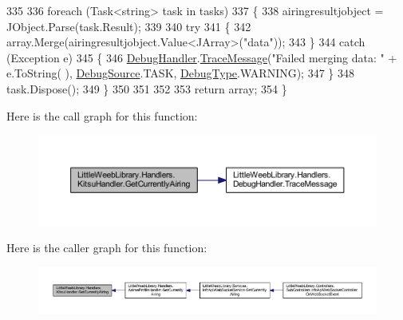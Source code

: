 \begin{DoxyCode}
335 
336             \textcolor{keywordflow}{foreach} (Task<string> task \textcolor{keywordflow}{in} tasks)
337             \{
338                 airingresultjobject = JObject.Parse(task.Result);
339 
340                 \textcolor{keywordflow}{try}
341                 \{
342                     array.Merge(airingresultjobject.Value<JArray>(\textcolor{stringliteral}{"data"}));
343                 \}
344                 \textcolor{keywordflow}{catch} (Exception e)
345                 \{
346                     \mbox{\hyperlink{class_little_weeb_library_1_1_handlers_1_1_kitsu_handler_a6d3c55fa5eee15320845c2d902c96882}{DebugHandler}}.\mbox{\hyperlink{interface_little_weeb_library_1_1_handlers_1_1_i_debug_handler_a2e405bc3492e683cd3702fae125221bc}{TraceMessage}}(\textcolor{stringliteral}{"Failed merging data: "} + e.ToString(
      ), \mbox{\hyperlink{namespace_little_weeb_library_1_1_handlers_a2a6ca0775121c9c503d58aa254d292be}{DebugSource}}.TASK, \mbox{\hyperlink{namespace_little_weeb_library_1_1_handlers_ab66019ed40462876ec4e61bb3ccb0a62}{DebugType}}.WARNING);
347                 \}
348                 task.Dispose();
349             \}
350 
351 
352 
353             \textcolor{keywordflow}{return} array;
354         \}
\end{DoxyCode}
Here is the call graph for this function\+:\nopagebreak
\begin{figure}[H]
\begin{center}
\leavevmode
\includegraphics[width=350pt]{class_little_weeb_library_1_1_handlers_1_1_kitsu_handler_af733f442659b7789588da55b00c065c4_cgraph}
\end{center}
\end{figure}
Here is the caller graph for this function\+:\nopagebreak
\begin{figure}[H]
\begin{center}
\leavevmode
\includegraphics[width=350pt]{class_little_weeb_library_1_1_handlers_1_1_kitsu_handler_af733f442659b7789588da55b00c065c4_icgraph}
\end{center}
\end{figure}
\mbox{\label{class_little_weeb_library_1_1_handlers_1_1_kitsu_handler_aabd039f9220f03f5c9dcf83e104531b1}} 
